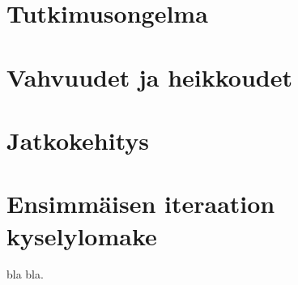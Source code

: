 \documentclass[utf8]{gradu3}
\begin{document}
\section{Tutkimusongelma}
\section{Vahvuudet ja heikkoudet}
\section{Jatkokehitys}

%

\printbibliography

\appendix
\section{Ensimmäisen iteraation kyselylomake}

bla bla.
\end{document}
